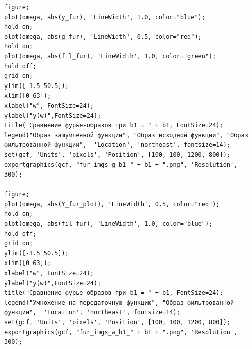 \documentclass[a4paper, 12pt]{article}
\begin{document}
\begin{lstlisting}[caption={Код для фильтрации функции во втором пункте}]
figure;
plot(omega, abs(y_fur), 'LineWidth', 1.0, color="blue");
hold on;
plot(omega, abs(g_fur), 'LineWidth', 0.5, color="red");
hold on;
plot(omega, abs(fil_fur), 'LineWidth', 1.0, color="green");
hold off;
grid on;
ylim([-1.5 50.5]);
xlim([0 63]);
xlabel("w", FontSize=24);
ylabel("y(w)",FontSize=24);
title("Сравнение фурье-образов при b1 = " + b1, FontSize=24);
legend("Образ зашумлённой функции", "Образ исходной функции", "Образ фильтрованной функции",  'Location', 'northeast', fontsize=14);
set(gcf, 'Units', 'pixels', 'Position', [100, 100, 1200, 800]);
exportgraphics(gcf, "fur_imgs_g_b1_" + b1 + ".png", 'Resolution', 300);

figure;
plot(omega, abs(Y_fur_plot), 'LineWidth', 0.5, color="red");
hold on;
plot(omega, abs(fil_fur), 'LineWidth', 1.0, color="blue");
hold off;
grid on;
ylim([-1.5 50.5]);
xlim([0 63]);
xlabel("w", FontSize=24);
ylabel("y(w)",FontSize=24);
title("Сравнение фурье-образов при b1 = " + b1, FontSize=24);
legend("Умножение на передаточную функцию", "Образ фильтрованной функции",  'Location', 'northeast', fontsize=14);
set(gcf, 'Units', 'pixels', 'Position', [100, 100, 1200, 800]);
exportgraphics(gcf, "fur_imgs_w_b1_" + b1 + ".png", 'Resolution', 300);
\end{lstlisting}
\end{document}
